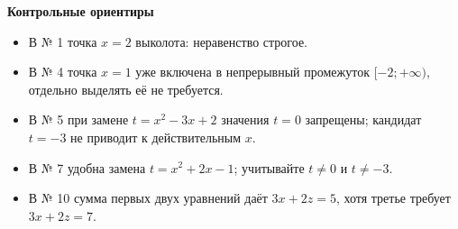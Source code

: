 \documentclass[a4paper,12pt]{article}
\begin{document}
\vspace{8mm}
\textbf{Контрольные ориентиры}
\begin{itemize}[leftmargin=7mm,itemsep=.55em]
\item В № 1 точка $x=2$ выколота: неравенство строгое.
\item В № 4 точка $x=1$ уже включена в непрерывный промежуток
$[-2;+\infty)$, отдельно выделять её не требуется.
\item В № 5 при замене $t=x^2-3x+2$ значения $t=0$ запрещены;
кандидат $t=-3$ не приводит к действительным $x$.
\item В № 7 удобна замена $t=x^2+2x-1$; учитывайте $t\ne0$ и $t\ne-3$.
\item В № 10 сумма первых двух уравнений даёт $3x+2z=5$,
хотя третье требует $3x+2z=7$.
\end{itemize}
\end{document}
